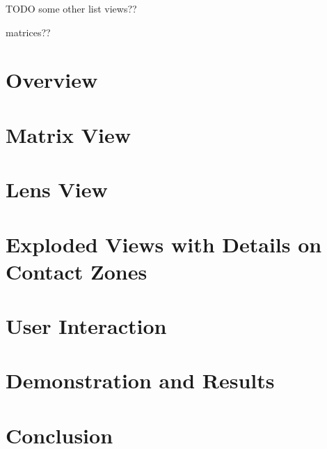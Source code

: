 \documentclass[journal]{vgtc}                %
\begin{document}
TODO some other list views??

matrices??

\section{Overview}


\section{Matrix View}

\section{Lens View}

\section{Exploded Views with Details on Contact Zones}

\section{User Interaction}

\section{Demonstration and Results}

\section{Conclusion}


%

%
%
%

\end{document}
